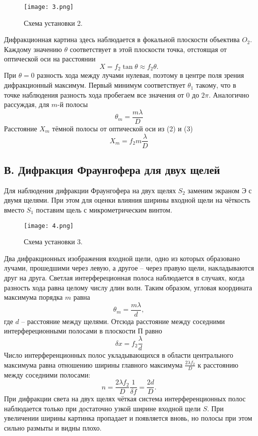 \begin{figure}[H]
	\texttt{[image: 3.png]}
	\centering
	\caption{Схема установки 2.}
\end{figure}
Дифракционная картина здесь наблюдается в фокальной плоскости объектива $O_2$. Каждому значению $\theta$ соответствует в этой плоскости точка, отстоящая от оптической оси на расстоянии 
\begin{equation}
X = f_2 \tan \theta \approx f_2 \theta.
\end{equation}
При $\theta = 0$ разность хода между лучами нулевая, поэтому в центре поля зрения дифракционный максимум. Первый минимум соответствует $\theta_1$ такому, что в точке наблюдения разность хода пробегаем все значения от 0 до $2\pi$. Аналогично рассуждая, для $m$-й полосы
\begin{equation}
\theta_m = \frac{m \lambda}{D}
\end{equation}
Расстояние $X_m$ тёмной полосы от оптической оси из (2) и (3)
\begin{equation}
X_m = f_2m\frac{\lambda}{D}
\end{equation}
\subsection*{В. Дифракция Фраунгофера для двух щелей}
Для наблюдения дифракции Фраунгофера на двух щелях $S_2$ заменим экраном Э с двумя щелями. При этом для оценки влияния ширины входной щели на чёткость вместо $S_1$ поставим щель с микрометрическим винтом.
\begin{figure}[H]
	\texttt{[image: 4.png]}
	\centering
	\caption{Схема установки 3.}
\end{figure}
Два дифракционных изображения входной щели, одно из которых образовано лучами, прошедшими через левую, а другое -- через правую щели, накладываются друг на друга.
Светлая интерфереционная полоса наблюдается в случаях, когда разность хода равна целому числу длин волн. Таким образом, угловая координата максимума порядка $m$ равна
\begin{equation}
\theta_m = \dfrac{m \lambda}{d},
\end{equation}
где $d$ -- расстояние между щелями. Отсюда расстояние между соседними интерфереционными полосами в плоскости П равно
\begin{equation}
\delta x = f_2 \dfrac{\lambda}{d}
\end{equation}
Число интерференционных полос укладывающихся в области центрального максимума равна отношению ширины главного максимума $\frac{2\lambda f_2}{D}$ к расстоянию между соседними полосами:
\begin{equation}
n = \dfrac{2\lambda f_2}{D} \dfrac{1}{\delta f}= \dfrac{2d}{D}.
\end{equation}
При дифракции света на двух щелях чёткая система интерференционных полос наблюдается только при достаточно узкой ширине входной щели $S$. При увеличении ширины картинка пропадает и появляется вновь, но полосы при этом сильно размыты и видны плохо.
